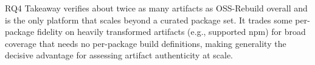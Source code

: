 \begin{rqanswer}{RQ4 Takeaway}
\toolname verifies about twice as many artifacts as OSS-Rebuild overall and is the only platform that scales beyond a curated package set. It trades some per-package fidelity on heavily transformed artifacts (e.g., supported npm) for broad coverage that needs no per-package build definitions, making generality the decisive advantage for assessing artifact authenticity at scale.
\end{rqanswer}



